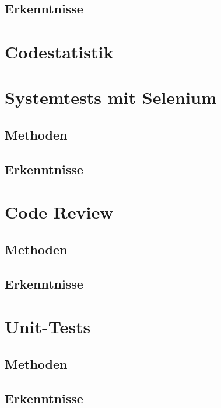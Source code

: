 \subsection{Erkenntnisse}



\section{Codestatistik}



\section{Systemtests mit Selenium}

\subsection{Methoden}

\subsection{Erkenntnisse}

\section{Code Review}

\subsection{Methoden}

\subsection{Erkenntnisse}

\section{Unit-Tests}

\subsection{Methoden}

\subsection{Erkenntnisse}



